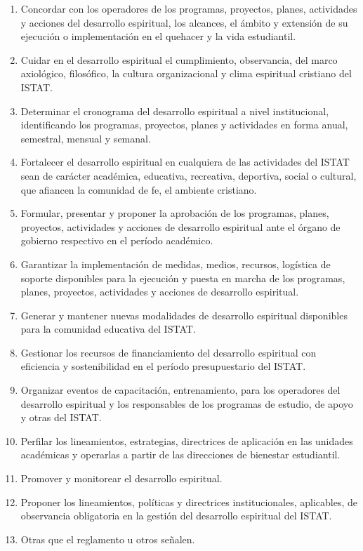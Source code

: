 \begin{enumerate}
\item Concordar con los operadores de los programas, proyectos, planes, actividades y acciones del desarrollo espiritual, los alcances, el ámbito y extensión de su ejecución o implementación en el quehacer y la vida estudiantil. 
\item Cuidar en el desarrollo espiritual el cumplimiento, observancia, del marco axiológico, filosófico, la cultura organizacional y clima espiritual cristiano del ISTAT. 
\item Determinar el cronograma del desarrollo espiritual  a nivel institucional, identificando los programas, proyectos, planes y actividades en forma anual, semestral, mensual y semanal. 
\item Fortalecer el desarrollo espiritual en cualquiera de las actividades del ISTAT sean de carácter académica, educativa, recreativa, deportiva, social o cultural, que afiancen la comunidad de fe, el ambiente cristiano.   
\item Formular, presentar y proponer la aprobación de los programas, planes, proyectos, actividades y acciones de desarrollo espiritual ante el órgano de gobierno respectivo en el período académico. 
\item Garantizar la implementación de medidas, medios, recursos, logística de soporte disponibles para la ejecución y puesta en marcha de los programas, planes, proyectos, actividades y acciones de desarrollo espiritual. 
\item Generar y mantener nuevas modalidades de desarrollo espiritual disponibles para la comunidad educativa del ISTAT. 
\item Gestionar los recursos de financiamiento del desarrollo espiritual con eficiencia y sostenibilidad en el período presupuestario del ISTAT. 
\item Organizar eventos de capacitación, entrenamiento, para los operadores del desarrollo espiritual y los responsables de los programas de estudio, de apoyo y otras del ISTAT. 
\item Perfilar los lineamientos, estrategias, directrices de aplicación en las unidades académicas y operarlas a partir de las direcciones de bienestar estudiantil. 
\item Promover y monitorear el desarrollo espiritual. 
\item Proponer los lineamientos, políticas y directrices institucionales, aplicables, de observancia obligatoria en la gestión del desarrollo espiritual del ISTAT. 
\item Otras que el reglamento u otros señalen. 
\end{enumerate}
